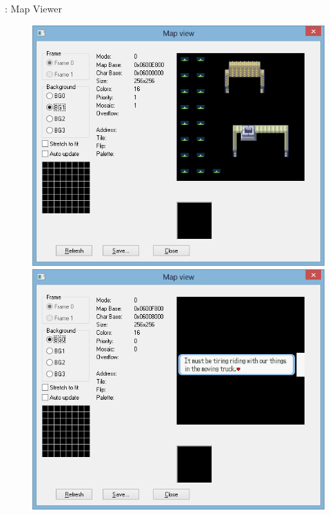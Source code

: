 \documentclass{beamer}
\begin{document}
\begin{darkframes}
\begin{frame}{\subsecname: Map Viewer}
\begin{figure}
        \includegraphics[width=1\textwidth,height=0.4\textheight,keepaspectratio]{mapview3}
        \includegraphics[width=1\textwidth,height=0.4\textheight,keepaspectratio]{mapview4}
    \end{figure}
\end{frame}


\end{darkframes}
\end{document}
